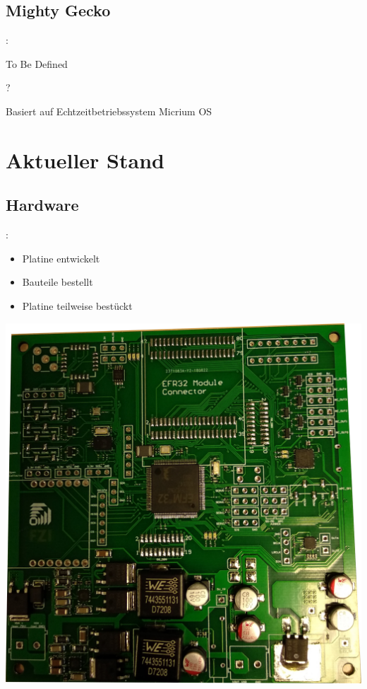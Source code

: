 \documentclass{beamer}
\begin{document}
\subsection{Mighty Gecko}
\begin{frame}{\insertsection: \insertsubsection}

	\begin{center}
		{\Huge To Be Defined} 
		
		{\Huge ?}
	\end{center}

Basiert auf Echtzeitbetriebssystem Micrium OS
\end{frame}

\section{Aktueller Stand}
\subsection{Hardware}
\begin{frame}{\insertsection: \insertsubsection}
\begin{minipage}{0.45\linewidth}
	\begin{itemize}
		\item Platine entwickelt
		\item Bauteile bestellt
		\item Platine teilweise bestückt
	\end{itemize}
\end{minipage} \quad
\begin{minipage}{0.45\linewidth}
	\includegraphics[width=\linewidth]{platine2}
\end{minipage}
\end{frame}
\end{document}
